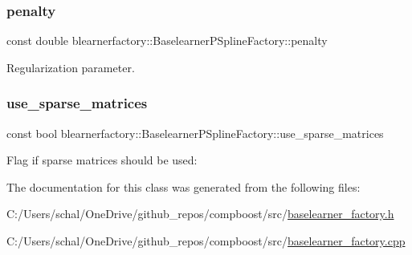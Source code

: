 \subsubsection{\texorpdfstring{penalty}{penalty}}
{\footnotesize\ttfamily const double blearnerfactory\+::\+Baselearner\+P\+Spline\+Factory\+::penalty\hspace{0.3cm}{\ttfamily [private]}}



Regularization parameter. 

\mbox{\label{classblearnerfactory_1_1_baselearner_p_spline_factory_ac0e83c55bc1d631663f639fea394e253}} 
\subsubsection{\texorpdfstring{use\+\_\+sparse\+\_\+matrices}{use\_sparse\_matrices}}
{\footnotesize\ttfamily const bool blearnerfactory\+::\+Baselearner\+P\+Spline\+Factory\+::use\+\_\+sparse\+\_\+matrices\hspace{0.3cm}{\ttfamily [private]}}



Flag if sparse matrices should be used\+: 



The documentation for this class was generated from the following files\+:\begin{DoxyCompactItemize}
\item 
C\+:/\+Users/schal/\+One\+Drive/github\+\_\+repos/compboost/src/\mbox{\hyperlink{baselearner__factory_8h}{baselearner\+\_\+factory.\+h}}\item 
C\+:/\+Users/schal/\+One\+Drive/github\+\_\+repos/compboost/src/\mbox{\hyperlink{baselearner__factory_8cpp}{baselearner\+\_\+factory.\+cpp}}\end{DoxyCompactItemize}
